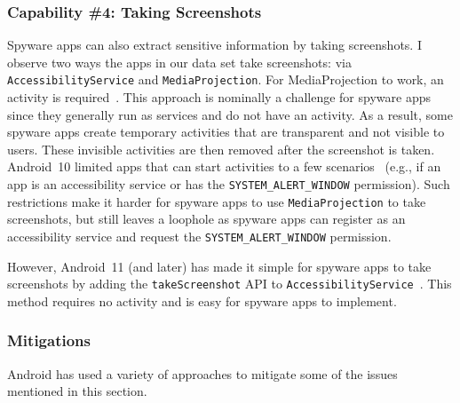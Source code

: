 
\subsubsection*{Capability \#4: Taking Screenshots}
\label{subsubsec:screenshot}
Spyware apps can also extract sensitive information by taking screenshots. I
observe two ways the apps in our data set take screenshots: via
\texttt{AccessibilityService} and \texttt{MediaProjection}. For MediaProjection
to work, an activity is required~\cite{androidH20:online}. This approach is
nominally a challenge for spyware apps since they generally run as services and
do not have an activity. As a result, some spyware apps create temporary
activities that are transparent and not visible to users. These invisible
activities are then removed after the screenshot is taken.  Android~10 limited
apps that can start activities to a few scenarios~\cite{Restrict50:online}
(e.g., if an app is an accessibility service or has the \texttt{SYSTEM\_ALERT\_WINDOW}
permission). Such restrictions make it harder for spyware apps to use
\texttt{MediaProjection} to take screenshots, but still leaves a loophole as spyware apps
can register as an accessibility service and request the \texttt{SYSTEM\_ALERT\_WINDOW}
permission.

However, Android~11 (and later) has made it
simple for spyware apps to take screenshots by adding the
\texttt{takeScreenshot} API to \texttt{AccessibilityService}~\cite{Accessib97:online}.
This method requires no activity and is easy for spyware apps to implement.


\subsubsection{Mitigations}
Android has used a variety of approaches to mitigate some of the issues mentioned in this section.

